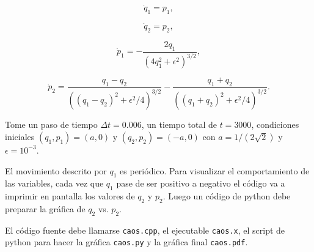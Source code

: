 \documentclass[11pt,letterpaper]{exam}
\begin{document}
\begin{questions}
\begin{equation}
\dot{q}_1 = p_1,
\end{equation}

\begin{equation}
\dot{q}_2 = p_2,
\end{equation}

\begin{equation}
\dot{p}_1 = -\frac{2q_1}{(4q_1^2 + \epsilon^2)^{3/2}},
\end{equation}

\begin{equation}
\dot{p}_2 = \frac{q_1 - q_2}{((q_1 - q_2)^2 + \epsilon^2/4)^{3/2}} -
\frac{q_1+q_2}{((q_1 + q_2)^2 + \epsilon^{2}/4)^{3/2}}.
\end{equation}


Tome un paso de tiempo $\Delta t=0.006$, un tiempo total de
$t=3000$, condiciones iniciales $(q_1, p_1)=(a,0)$ y $(q_2,
p_2)=(-a,0)$ con $a=1/(2\sqrt{2})$ y $\epsilon=10^{-3}$.


El movimiento descrito por $q_1$ es peri\'odico. Para visualizar el
comportamiento de las variables, cada vez que $q_1$ pase de ser
positivo a negativo el c\'odigo va a imprimir en pantalla los valores de $q_2$
y $p_2$.  Luego un c\'odigo de python debe preparar la gr\'afica de
$q_2$ vs. $p_2$.

El c\'odigo fuente debe llamarse \verb"caos.cpp", el ejecutable
\verb"caos.x", el script de python para hacer la gr\'afica
\verb"caos.py" y la gr\'afica final \verb"caos.pdf".



\end{questions}
\end{document}
